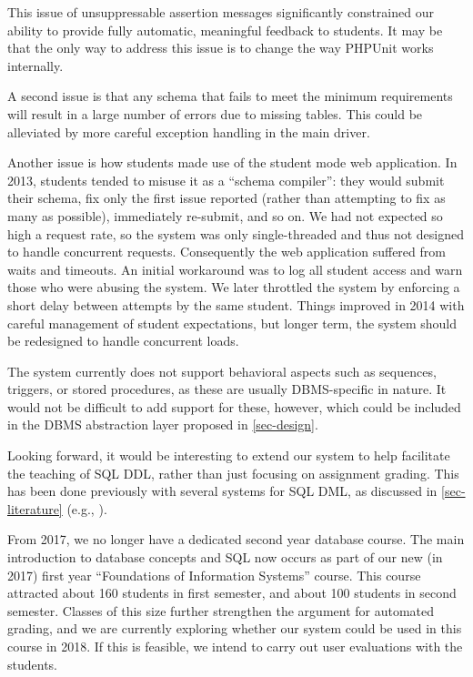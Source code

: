 \documentclass[sigconf, review, anonymous, capitalise]{acmart}
\begin{document}
This issue of unsuppressable assertion messages significantly constrained our ability to provide fully automatic, meaningful feedback to students. It may be that the only way to address this issue is to change the way PHPUnit works internally.

A second issue is that any schema that fails to meet the minimum requirements will result in a large number of errors due to missing tables.  This could be alleviated by more careful exception handling in the main driver.

Another issue is how students made use of the student mode web application. In 2013, students tended to misuse it as a ``schema compiler'': they would submit their schema, fix only the first issue reported (rather than attempting to fix as many as possible), immediately re-submit, and so on. We had not expected so high a request rate, so the system was only single-threaded and thus not designed to handle concurrent requests. Consequently the web application suffered from waits and timeouts. An initial workaround was to log all student access and warn those who were abusing the system. We later throttled the system by enforcing a short delay between attempts by the same student. Things improved in 2014 with careful management of student expectations, but longer term, the system should be redesigned to handle concurrent loads.

The system currently does not support behavioral aspects such as sequences, triggers, or stored procedures, as these are usually DBMS-specific in nature. It would not be difficult to add support for these, however, which could be included in the DBMS abstraction layer proposed in \cref{sec-design}.

Looking forward, it would be interesting to extend our system to help facilitate the teaching of SQL DDL, rather than just focusing on assignment grading. This has been done previously with several systems for SQL DML, as discussed in \cref{sec-literature} (e.g., \cite{Kenny.C-2005a-Automated,Kleiner.C-2013a-Automated,Mitrovic.A-1998a-Learning,Russell.G-2004a-Improving,Sadiq.S-2004a-SQLator}).

From 2017, we no longer have a dedicated second year database course. The main introduction to database concepts and SQL now occurs as part of our new (in 2017) first year ``Foundations of Information Systems'' course. This course attracted about 160 students in first semester, and about 100 students in second semester. Classes of this size further strengthen the argument for automated grading, and we are currently exploring whether our system could be used in this course in 2018. If this is feasible,  we intend to carry out user evaluations with the students.
\end{document}
